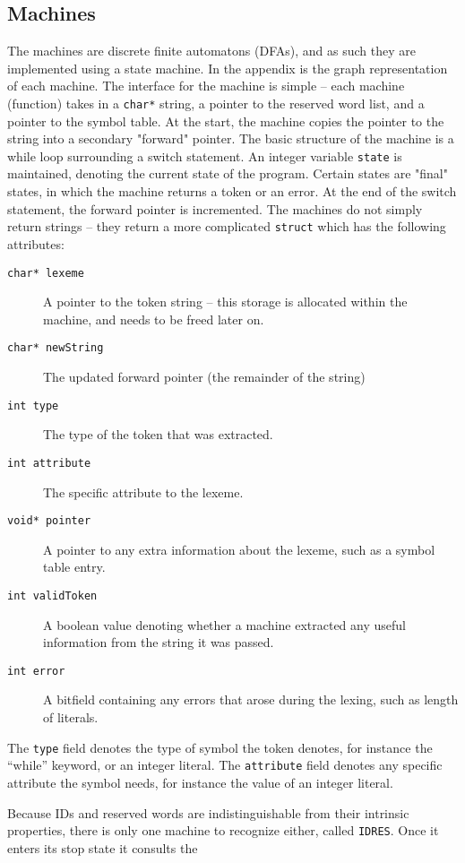 \documentclass[titlepage]{article}
\begin{document}
		\subsection{Machines}
			The machines are discrete finite automatons (DFAs), and as such they are implemented using a state machine. In the appendix is the graph representation of each machine. The interface for the machine is simple -- each machine (function) takes in a \texttt{char*} string, a pointer to the reserved word list, and a pointer to the symbol table.
			At the start, the machine copies the pointer to the string into a secondary "forward" pointer. The basic structure of the machine is a while loop surrounding a switch statement. An integer variable \texttt{state} is maintained, denoting the current state of the program. Certain states are "final" states, in which the machine returns a token or an error. At the end of the switch statement, the forward pointer is incremented.
			The machines do not simply return strings -- they return a more complicated \texttt{struct} which has the following attributes:
			\begin{description}
				\item[\texttt{char* lexeme}] A pointer to the token string -- this storage is allocated within the machine, and needs to be freed later on.
				\item[\texttt{char* newString}] The updated forward pointer (the remainder of the string)
				\item[\texttt{int type}] The type of the token that was extracted.
				\item[\texttt{int attribute}] The specific attribute to the lexeme.
				\item[\texttt{void* pointer}] A pointer to any extra information about the lexeme, such as a symbol table entry.
				\item[\texttt{int validToken}] A boolean value denoting whether a machine extracted any useful information from the string it was passed.
				\item[\texttt{int error}] A bitfield containing any errors that arose during the lexing, such as length of literals.
			\end{description}
			The \texttt{type} field denotes the type of symbol the token denotes, for instance the ``while'' keyword, or an integer literal.
			The \texttt{attribute} field denotes any specific attribute the symbol needs, for instance the value of an integer literal.
			
			Because IDs and reserved words are indistinguishable from their intrinsic properties, there is only one machine to recognize either, called \texttt{IDRES}. Once it enters its stop state it consults the 
\end{document}
